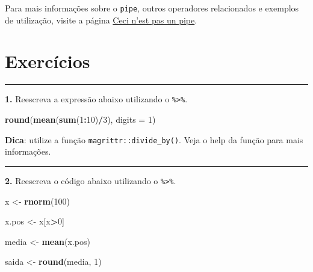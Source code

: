\documentclass[]{book}
\newenvironment{Shaded}{\begin{snugshade}}{\end{snugshade}}
\newcommand{\CommentTok}[1]{\textcolor[rgb]{0.56,0.35,0.01}{\textit{#1}}}
\newcommand{\DataTypeTok}[1]{\textcolor[rgb]{0.13,0.29,0.53}{#1}}
\newcommand{\DecValTok}[1]{\textcolor[rgb]{0.00,0.00,0.81}{#1}}
\newcommand{\KeywordTok}[1]{\textcolor[rgb]{0.13,0.29,0.53}{\textbf{#1}}}
\newcommand{\NormalTok}[1]{#1}
\newcommand{\OperatorTok}[1]{\textcolor[rgb]{0.81,0.36,0.00}{\textbf{#1}}}
\newcommand{\StringTok}[1]{\textcolor[rgb]{0.31,0.60,0.02}{#1}}
\begin{document}
\begin{Shaded}
\end{Shaded}

Para mais informações sobre o \texttt{pipe}, outros operadores relacionados e exemplos de utilização, visite a página \href{http://cran.r-project.org/web/packages/magrittr/vignettes/magrittr.html}{Ceci n'est pas un pipe}.

\hypertarget{exercuxedcios-1}{%
\section{Exercícios}\label{exercuxedcios-1}}

\begin{center}\rule{0.5\linewidth}{\linethickness}\end{center}

\textbf{1.} Reescreva a expressão abaixo utilizando o \texttt{\%\textgreater{}\%}.

\begin{Shaded}
\begin{Highlighting}[]
\KeywordTok{round}\NormalTok{(}\KeywordTok{mean}\NormalTok{(}\KeywordTok{sum}\NormalTok{(}\DecValTok{1}\OperatorTok{:}\DecValTok{10}\NormalTok{)}\OperatorTok{/}\DecValTok{3}\NormalTok{), }\DataTypeTok{digits =} \DecValTok{1}\NormalTok{)}
\end{Highlighting}
\end{Shaded}

\textbf{Dica}: utilize a função \texttt{magrittr::divide\_by()}. Veja o help da função para mais informações.

\begin{center}\rule{0.5\linewidth}{\linethickness}\end{center}

\textbf{2.} Reescreva o código abaixo utilizando o \texttt{\%\textgreater{}\%}.

\begin{Shaded}
\begin{Highlighting}[]

\NormalTok{x <-}\StringTok{ }\KeywordTok{rnorm}\NormalTok{(}\DecValTok{100}\NormalTok{)}

\NormalTok{x.pos <-}\StringTok{ }\NormalTok{x[x}\OperatorTok{>}\DecValTok{0}\NormalTok{]}

\NormalTok{media <-}\StringTok{ }\KeywordTok{mean}\NormalTok{(x.pos)}

\NormalTok{saida <-}\StringTok{ }\KeywordTok{round}\NormalTok{(media, }\DecValTok{1}\NormalTok{)}
\end{Highlighting}
\end{Shaded}
\end{document}

